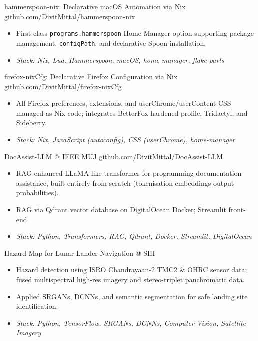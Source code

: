 \documentclass[11pt,a4paper]{moderncv}
\begin{document}
%
  {hammerspoon-nix: Declarative macOS Automation via Nix }%
  {\href{https://github.com/DivitMittal/hammerspoon-nix}{github.com/DivitMittal/hammerspoon-nix}}{}{}%
{%
  \begin{itemize}
    \item First-class \texttt{programs.hammerspoon} Home Manager option supporting
      package management, \texttt{configPath}, and declarative Spoon installation.
    \item \textit{Stack: Nix, Lua, Hammerspoon, macOS, home-manager, flake-parts}
  \end{itemize}%
}

%
  {firefox-nixCfg: Declarative Firefox Configuration via Nix }%
  {\href{https://github.com/DivitMittal/firefox-nixCfg}{github.com/DivitMittal/firefox-nixCfg}}{}{}%
{%
  \begin{itemize}
    \item All Firefox preferences, extensions, and userChrome/userContent CSS managed as
      Nix code; integrates BetterFox hardened profile, Tridactyl, and Sideberry.
    \item \textit{Stack: Nix, JavaScript (autoconfig), CSS (userChrome), home-manager}
  \end{itemize}%
}

%
  {DocAssist-LLM @ IEEE MUJ}%
  {\href{https://github.com/DivitMittal/DocAssist-LLM}{github.com/DivitMittal/DocAssist-LLM}}{}{}%
{%
  \begin{itemize}
    \item RAG-enhanced LLaMA-like transformer for programming documentation assistance,
      built entirely from scratch (tokenisation \textrightarrow{} embeddings \textrightarrow{} output probabilities).
    \item RAG via Qdrant vector database on DigitalOcean Docker; Streamlit front-end.
    \item \textit{Stack: Python, Transformers, RAG, Qdrant, Docker, Streamlit, DigitalOcean}
  \end{itemize}%
}

%
  {Hazard Map for Lunar Lander Navigation @ SIH}{}{}{}%
{%
  \begin{itemize}
    \item Hazard detection using ISRO Chandrayaan-2 TMC2 \& OHRC sensor data;
      fused multispectral high-res imagery and stereo-triplet panchromatic data.
    \item Applied SRGANs, DCNNs, and semantic segmentation for safe landing site
      identification.
    \item \textit{Stack: Python, TensorFlow, SRGANs, DCNNs, Computer Vision, Satellite Imagery}
  \end{itemize}%
}
\end{document}
